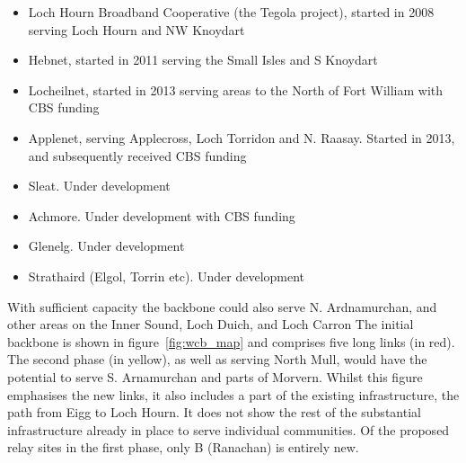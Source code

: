 \begin{itemize}
  \item Loch Hourn Broadband Cooperative (the Tegola project), started
    in 2008 serving Loch Hourn and NW Knoydart 
  \item Hebnet, started in 2011 serving the Small Isles and S Knoydart
  \item Locheilnet, started in 2013 serving areas to the North of Fort
    William with CBS funding 
  \item Applenet, serving Applecross, Loch Torridon and
    N. Raasay. Started in 2013, and subsequently received CBS funding
  \item Sleat. Under development
  \item Achmore.  Under development with CBS funding
  \item Glenelg. Under development
  \item Strathaird (Elgol, Torrin etc).  Under development
\end{itemize}
 
With sufficient capacity the backbone could also serve
N. Ardnamurchan,  and other areas on the Inner Sound, Loch Duich, and Loch Carron
The initial backbone is shown in figure~\ref{fig:wcb_map} and
comprises five long links (in red).  The second phase (in yellow), as
well as serving North Mull, would have the potential to serve
S. Arnamurchan and parts of Morvern.  Whilst this figure emphasises
the new links, it also includes a part of the existing infrastructure,
the path from Eigg to Loch Hourn. It does not show the rest of the
substantial infrastructure already in place to serve individual
communities.  Of the proposed relay sites in the first phase, only B
(Ranachan) is entirely new.

